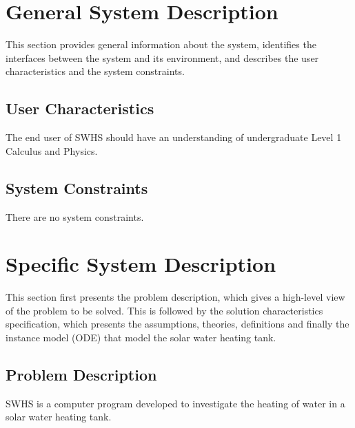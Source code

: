 \documentclass[12pt]{article}
\newcommand{\progname}{SWHS}
\begin{document}

\section{General System Description}

This section provides general information about the system,
identifies the interfaces between the system and its environment, and describes the
user characteristics and the system constraints.


\subsection{User Characteristics}

The end user of \progname{} should have an understanding of undergraduate Level
1 Calculus and Physics.

\subsection{System Constraints}

There are no system constraints.

\section{Specific System Description}

This section first presents the problem description, which gives a high-level
view of the problem to be solved.  This is followed by the solution characteristics
specification, which presents the assumptions, theories, definitions and finally
the instance model (ODE) that model the solar water heating tank.%

\subsection{Problem Description} \label{Sec_pd}

\progname{} is a computer program developed to investigate the 
heating of water in a solar water heating tank.
\end{document}
